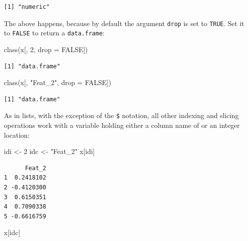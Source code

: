 \documentclass[
]{book}
\newenvironment{Shaded}{\begin{snugshade}}{\end{snugshade}}
\newcommand{\AttributeTok}[1]{\textcolor[rgb]{0.77,0.63,0.00}{#1}}
\newcommand{\ConstantTok}[1]{\textcolor[rgb]{0.00,0.00,0.00}{#1}}
\newcommand{\DecValTok}[1]{\textcolor[rgb]{0.00,0.00,0.81}{#1}}
\newcommand{\FunctionTok}[1]{\textcolor[rgb]{0.00,0.00,0.00}{#1}}
\newcommand{\NormalTok}[1]{#1}
\newcommand{\OtherTok}[1]{\textcolor[rgb]{0.56,0.35,0.01}{#1}}
\newcommand{\StringTok}[1]{\textcolor[rgb]{0.31,0.60,0.02}{#1}}
\begin{document}
\begin{verbatim}
[1] "numeric"
\end{verbatim}

The above happens, because by default the argument \texttt{drop} is set to \texttt{TRUE}. Set it to \texttt{FALSE} to return a \texttt{data.frame}:

\begin{Shaded}
\begin{Highlighting}[]
\FunctionTok{class}\NormalTok{(x[, }\DecValTok{2}\NormalTok{, }\AttributeTok{drop =} \ConstantTok{FALSE}\NormalTok{])}
\end{Highlighting}
\end{Shaded}

\begin{verbatim}
[1] "data.frame"
\end{verbatim}

\begin{Shaded}
\begin{Highlighting}[]
\FunctionTok{class}\NormalTok{(x[, }\StringTok{"Feat\_2"}\NormalTok{, }\AttributeTok{drop =} \ConstantTok{FALSE}\NormalTok{])}
\end{Highlighting}
\end{Shaded}

\begin{verbatim}
[1] "data.frame"
\end{verbatim}

As in lists, with the exception of the \texttt{\$} notation, all other indexing and slicing operations work with a variable holding either a column name of or an integer location:

\begin{Shaded}
\begin{Highlighting}[]
\NormalTok{idi }\OtherTok{\textless{}{-}} \DecValTok{2}
\NormalTok{idc }\OtherTok{\textless{}{-}} \StringTok{"Feat\_2"}
\NormalTok{x[idi]}
\end{Highlighting}
\end{Shaded}

\begin{verbatim}
      Feat_2
1  0.2418102
2 -0.4120300
3  0.6150351
4  0.7090338
5 -0.6616759
\end{verbatim}

\begin{Shaded}
\begin{Highlighting}[]
\NormalTok{x[idc]}
\end{Highlighting}
\end{Shaded}
\end{document}
